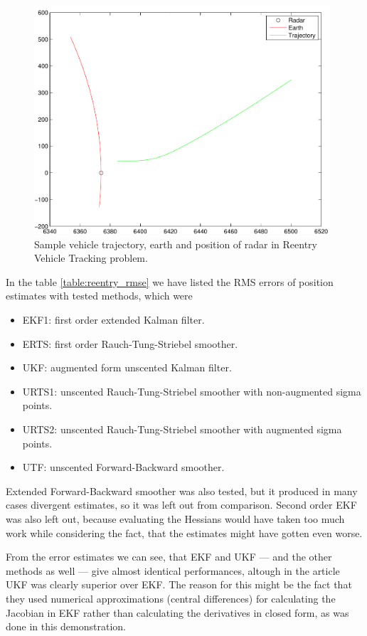 \begin{figure}
\begin{center}
\includegraphics[width=11cm]{pics/reentry_trajectory}
\caption{Sample vehicle trajectory, earth and position of radar in
Reentry Vehicle Tracking problem.}
\label{fig:reentry_traj}
\end{center}
\end{figure}

In the table \ref{table:reentry_rmse} we have listed the RMS errors of
position estimates with tested methods, which were
%
\begin{itemize}
%
\item EKF1: first order extended Kalman filter.
\item ERTS: first order Rauch-Tung-Striebel smoother.
\item UKF: augmented form unscented Kalman filter.
\item URTS1: unscented Rauch-Tung-Striebel smoother with non-augmented
sigma points.
\item URTS2: unscented Rauch-Tung-Striebel smoother with augmented
sigma points.
\item UTF: unscented Forward-Backward smoother.
%
\end{itemize}
%
Extended Forward-Backward smoother was also tested, but it produced in
many cases divergent estimates, so it was left out from
comparison. Second order EKF was also left out, because evaluating the
Hessians would have taken too much work while considering the fact,
that the estimates might have gotten even worse.

From the error estimates we can see, that EKF and UKF --- and the
other methods as well --- give almost
identical performances, altough in the article \citep{Julier+Uhlmann:2004} UKF was clearly superior over EKF. The reason for this might be
the fact that they used numerical approximations (central differences)
for calculating the Jacobian in EKF rather than calculating the
derivatives in closed form, as was done in this demonstration.

